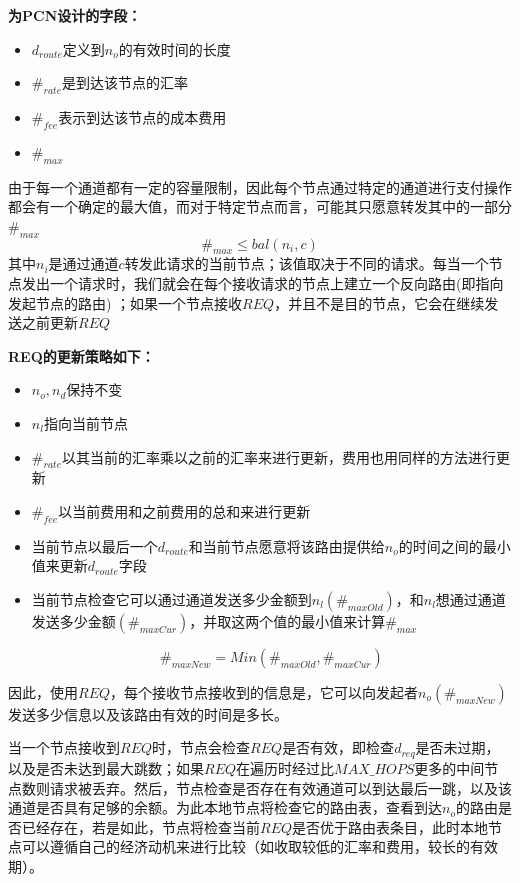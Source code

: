 \documentclass[12pt,a4paper]{article}
\begin{document}
\textbf{为PCN设计的字段：}
\begin{itemize}
\item $d_{route}$定义到$n_o$的有效时间的长度
\item $\#_{rate}$是到达该节点的汇率
\item $\#_{fee}$表示到达该节点的成本费用
\item $\#_{max}$
\end{itemize}

由于每一个通道都有一定的容量限制，因此每个节点通过特定的通道进行支付操作都会有一个确定的最大值，而对于特定节点而言，可能其只愿意转发其中的一部分$\#_{max}$
\begin{equation}
\#_{max} \leq bal(n_i,c)
\end{equation}
其中$n_i$是通过通道$c$转发此请求的当前节点；该值取决于不同的请求。每当一个节点发出一个请求时，我们就会在每个接收请求的节点上建立一个反向路由(即指向发起节点的路由) ；如果一个节点接收$REQ$，并且不是目的节点，它会在继续发送之前更新$REQ$

\textbf{REQ的更新策略如下：}
\begin{itemize}
\item $n_o, n_d$保持不变
\item $n_l$指向当前节点
\item $\#_{rate}$以其当前的汇率乘以之前的汇率来进行更新，费用也用同样的方法进行更新
\item $\#_{fee}$以当前费用和之前费用的总和来进行更新
\item 当前节点以最后一个$d_{route}$和当前节点愿意将该路由提供给$n_o$的时间之间的最小值来更新$d_{route}$字段
\item 当前节点检查它可以通过通道发送多少金额到$n_l (\#_{maxOld})$，和$n_l$想通过通道发送多少金额$(\#_{maxCur})$，并取这两个值的最小值来计算$\#_{max}$

\begin{equation}
\#_{maxNew}=Min(\#_{maxOld},\#_{maxCur})
\end{equation}
\end{itemize}
因此，使用$REQ$，每个接收节点接收到的信息是，它可以向发起者$n_o(\#_{maxNew})$发送多少信息以及该路由有效的时间是多长。

当一个节点接收到$REQ$时，节点会检查$REQ$是否有效，即检查$d_{req}$是否未过期，以及是否未达到最大跳数；如果$REQ$在遍历时经过比$MAX\_HOPS$更多的中间节点数则请求被丢弃。然后，节点检查是否存在有效通道可以到达最后一跳，以及该通道是否具有足够的余额。为此本地节点将检查它的路由表，查看到达$n_o$的路由是否已经存在，若是如此，节点将检查当前$REQ$是否优于路由表条目，此时本地节点可以遵循自己的经济动机来进行比较（如收取较低的汇率和费用，较长的有效期）。
\end{document}
